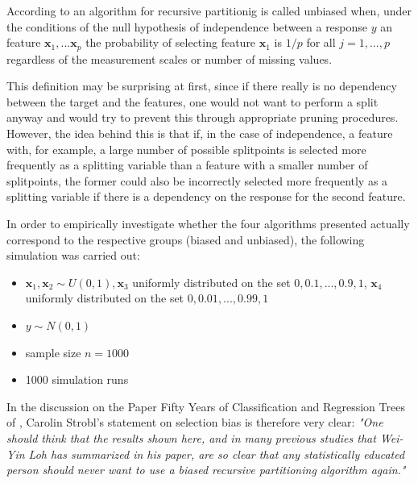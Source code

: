 According to \citep{Hothorn.2006} an algorithm for recursive partitionig is called unbiased when, under the conditions of the null hypothesis of independence between a response $y$ an feature $\textbf{x}_{1},...\textbf{x}_{p}$ the probability of selecting feature $\textbf{x}_{1}$ is $1/p$ for all $j = 1,...,p$ regardless of the measurement scales or number of missing values. 

This definition may be surprising at first, since if there really is no dependency between the target and the features, one would not want to perform a split anyway and would try to prevent this through appropriate pruning procedures.
However, the idea behind this is that if, in the case of independence, a feature with, for example, a large number of possible splitpoints is selected more frequently as a splitting variable than a feature with a smaller number of splitpoints, the former could also be incorrectly selected more frequently as a splitting variable if there is a dependency on the response for the second feature.
\citep{Loh.2014}


In order to empirically investigate whether the four algorithms presented actually correspond to the respective groups (biased and unbiased), the following simulation was carried out:
\begin{itemize}
    \item $\textbf{x}_{1}, \textbf{x}_{2} \sim U(0,1), \textbf{x}_3$ uniformly distributed on the set ${0, 0.1,..., 0.9, 1}$, $\textbf{x}_4$ uniformly distributed on the set ${0, 0.01,..., 0.99, 1}$
    \item $y \sim N(0,1)$
    \item sample size $n = 1000$
    \item 1000 simulation runs
\end{itemize}






In the discussion on the Paper Fifty Years of Classification and Regression Trees of \citep{Loh.2014}, Carolin Strobl's statement on selection bias is therefore very clear:
\textit{"One should think that the results shown here, and in many previous studies that Wei-Yin Loh has summarized in his paper, are so clear that any statistically educated person should never
want to use a biased recursive partitioning algorithm again."}






\vspace{1cm}

